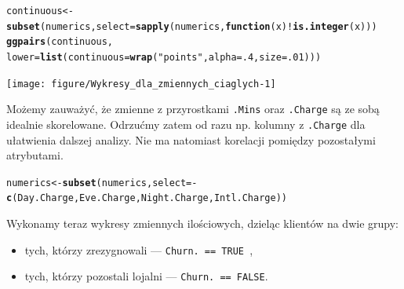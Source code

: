 \documentclass{article}\usepackage[]{graphicx}\usepackage[]{color}
\makeatletter
\newcommand{\hlnum}[1]{\textcolor[rgb]{0.686,0.059,0.569}{#1}}%
\newcommand{\hlstr}[1]{\textcolor[rgb]{0.192,0.494,0.8}{#1}}%
\newcommand{\hlopt}[1]{\textcolor[rgb]{0,0,0}{#1}}%
\newcommand{\hlstd}[1]{\textcolor[rgb]{0.345,0.345,0.345}{#1}}%
\newcommand{\hlkwa}[1]{\textcolor[rgb]{0.161,0.373,0.58}{\textbf{#1}}}%
\newcommand{\hlkwb}[1]{\textcolor[rgb]{0.69,0.353,0.396}{#1}}%
\newcommand{\hlkwc}[1]{\textcolor[rgb]{0.333,0.667,0.333}{#1}}%
\newcommand{\hlkwd}[1]{\textcolor[rgb]{0.737,0.353,0.396}{\textbf{#1}}}%
\newenvironment{kframe}{%
 \def\at@end@of@kframe{}%
 \ifinner\ifhmode%
  \def\at@end@of@kframe{\end{minipage}}%
  \begin{minipage}{\columnwidth}%
 \fi\fi%
 \def\FrameCommand##1{\hskip\@totalleftmargin \hskip-\fboxsep
 \colorbox{shadecolor}{##1}\hskip-\fboxsep
     \hskip-\linewidth \hskip-\@totalleftmargin \hskip\columnwidth}%
 \MakeFramed {\advance\hsize-\width
   \@totalleftmargin\z@ \linewidth\hsize
   \@setminipage}}%
 {\par\unskip\endMakeFramed%
 \at@end@of@kframe}
\newenvironment{knitrout}{}{} %
\makeatother
\begin{document}
\begin{knitrout}
\color{fgcolor}\begin{kframe}
\begin{alltt}
\hlstd{continuous} \hlkwb{<-} \hlkwd{subset}\hlstd{(numerics,} \hlkwc{select}\hlstd{=}\hlkwd{sapply}\hlstd{(numerics,} \hlkwa{function}\hlstd{(}\hlkwc{x}\hlstd{)} \hlopt{!}\hlkwd{is.integer}\hlstd{(x)))}
\hlkwd{ggpairs}\hlstd{(continuous,}
        \hlkwc{lower}\hlstd{=}\hlkwd{list}\hlstd{(}\hlkwc{continuous}\hlstd{=}\hlkwd{wrap}\hlstd{(}\hlstr{"points"}\hlstd{,} \hlkwc{alpha}\hlstd{=}\hlnum{.4}\hlstd{,} \hlkwc{size}\hlstd{=}\hlnum{.01}\hlstd{)))}
\end{alltt}
\end{kframe}

{\centering \texttt{[image: figure/Wykresy\_dla\_zmiennych\_ciaglych-1]} 

}



\end{knitrout}
Możemy zauważyć, że zmienne z przyrostkami \verb|.Mins| oraz \verb|.Charge| są ze sobą idealnie skorelowane. Odrzućmy zatem od razu np. kolumny z \verb|.Charge| dla ułatwienia dalszej analizy. Nie ma natomiast korelacji pomiędzy pozostałymi atrybutami.

\begin{knitrout}
\color{fgcolor}\begin{kframe}
\begin{alltt}
\hlstd{numerics} \hlkwb{<-} \hlkwd{subset}\hlstd{(numerics,} \hlkwc{select}\hlstd{=}\hlopt{-}\hlkwd{c}\hlstd{(Day.Charge, Eve.Charge, Night.Charge, Intl.Charge))}
\end{alltt}
\end{kframe}
\end{knitrout}

Wykonamy teraz wykresy zmiennych ilościowych, dzieląc klientów na dwie grupy:
\begin{itemize}
  \item tych, którzy zrezygnowali --- \verb|Churn. == TRUE |,
  \item tych, którzy pozostali lojalni --- \verb|Churn. == FALSE|.
\end{itemize}
\end{document}
